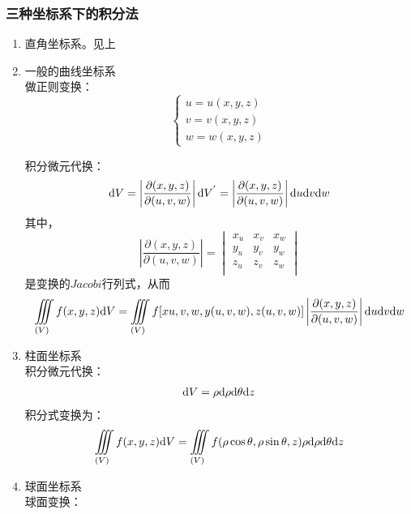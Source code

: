 \subsubsection{三种坐标系下的积分法}
\begin{enumerate}
	\item 直角坐标系。见上
	\item 一般的曲线坐标系\\
	做正则变换：
	\begin{equation}\label{key}
		\begin{cases}
			u=u(x,y,z)\\
			v=v(x,y,z)\\
			w=w(x,y,z)
		\end{cases}
	\end{equation}
	
	积分微元代换：
	\begin{align}
		\mathrm{d} V = \left | \dfrac{\partial (x,y,z)}{\partial(u,v,w)}\right | \mathrm{d} V^{'}= \left | \dfrac{\partial (x,y,z)}{\partial(u,v,w)}\right | \mathrm{d} u \mathrm{d} v \mathrm{d} w
	\end{align}
	其中，
	\begin{equation}\label{key}
		\left | \dfrac{\partial (x,y,z)}{\partial(u,v,w)}\right | = 
		\begin{vmatrix}
			x_u & x_v & x_w \\
			y_u & y_v & y_w \\
			z_u & z_v & z_w \\
		\end{vmatrix}
	\end{equation}
	是变换的$Jacobi$行列式，从而
	\begin{equation}\label{key}
		\iiint\limits_{(V)} f(x,y,z) \mathrm{d} V=
		\iiint\limits_{(V)}f[x{u,v,w},y(u,v,w),z(u,v,w)]\left | \dfrac{\partial (x,y,z)}{\partial(u,v,w)}\right | \mathrm{d} u \mathrm{d} v \mathrm{d} w
	\end{equation}
	\item 柱面坐标系\\
	积分微元代换：
	\begin{align}
		\mathrm{d} V = \rho \mathrm{d} \rho \mathrm{d} \theta \mathrm{d} z
	\end{align}
	积分式变换为：
	\begin{align}
		\iiint\limits_{(V)} f(x,y,z) \mathrm{d} V = \iiint\limits_{(V)} f(\rho \cos \theta,\rho \sin \theta,z) \rho \mathrm{d} \rho \mathrm{d} \theta \mathrm{d} z
	\end{align}
	\item 球面坐标系\\
	球面变换：
	\begin{align}

\end{align}
\end{enumerate}
